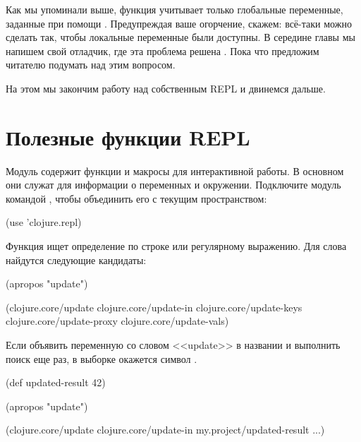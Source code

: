 Как мы упоминали выше, функция  учитывает только глобальные переменные, заданные при помощи . Предупреждая ваше огорчение, скажем: всё-таки можно сделать так, чтобы локальные переменные были доступны. В середине главы мы напишем свой отладчик, где эта проблема решена . Пока что предложим читателю подумать над этим вопросом.

На этом мы закончим работу над собственным REPL и двинемся дальше.

\section{Полезные функции REPL}


Модуль  содержит функции и макросы для интерактивной работы. В основном они служат для информации о переменных и окружении. Подключите модуль командой , чтобы объединить его с текущим пространством:

\begin{english}
  \begin{clojure}
(use 'clojure.repl)
  \end{clojure}
\end{english}

Функция  ищет определение по строке или регулярному выражению. Для слова  найдутся следующие кандидаты:

\begin{english}
  \begin{clojure}
(apropos "update")

(clojure.core/update
 clojure.core/update-in
 clojure.core/update-keys
 clojure.core/update-proxy
 clojure.core/update-vals)
  \end{clojure}
\end{english}

Если объявить переменную со словом <<update>> в названии и выполнить поиск еще раз, в выборке окажется символ .

\begin{english}
  \begin{clojure}
(def updated-result 42)

(apropos "update")

(clojure.core/update
 clojure.core/update-in
 my.project/updated-result
 ...)
  \end{clojure}
\end{english}

